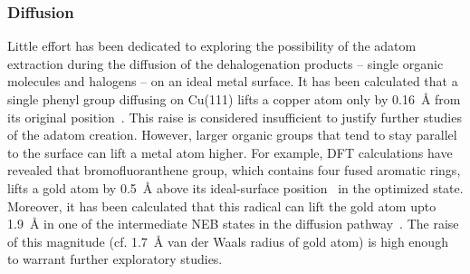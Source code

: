 \documentclass[%
 reprint,
 amsmath,amssymb,
 aps,
prb,
floatfix,
]{revtex4-2}
\newcommand{\lock}{\color{red}}
\newcommand{\lock}{\color{red}}
\begin{document}
\ifdefined\INTERNAL

\subsubsection{Diffusion}


\fi

{\lock

Little effort has been dedicated to exploring the possibility of the adatom extraction during the diffusion of the dehalogenation products  -- single organic molecules and halogens -- on an ideal metal surface. 
%
%
It has been calculated that a single phenyl group diffusing on Cu(111) lifts a copper atom only by \SI{0.16}{\angstrom} from its original position~\cite{pccp2010}. 
This raise is considered insufficient to justify further studies of the adatom creation.
However, larger organic groups that tend to stay parallel to the surface can lift a metal atom higher. 
For example, DFT calculations have revealed that bromofluoranthene group, which contains four fused aromatic rings, lifts a gold atom by \SI{0.5}{\angstrom} above its ideal-surface position~\cite{jpcc2018} in the optimized state. 
Moreover, it has been calculated that this radical can lift the gold atom upto \SI{1.9}{\angstrom} in one of the intermediate NEB states in the diffusion pathway~\cite{jpcc2018}.
The raise of this magnitude (cf. \SI{1.7}{\angstrom} van der Waals radius of gold atom) is high enough to warrant further exploratory studies.


}
\end{document}
